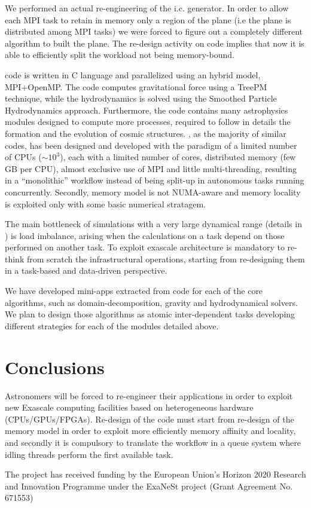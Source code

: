 \documentclass[11pt,twoside]{article}
\begin{document}
We performed an actual re-engineering of the i.c. generator. In order to allow each MPI task
to retain in memory only a region of the plane (i.e the plane is distributed among MPI tasks)
we were forced to figure out a completely different algorithm to built the plane.
The re-design activity on {} code implies that now it is able to
efficiently split the workload not being memory-bound.

{} code is written in C language and parallelized using an hybrid model, 
MPI+OpenMP. The code computes gravitational force using a TreePM technique, while the
hydrodynamics is solved using the Smoothed Particle Hydrodynamics approach.
Furthermore, the code contains many astrophysics modules designed to compute 
more processes, required to follow in details the formation and the evolution of cosmic structures.
{}, as the majority of similar codes, has been designed and developed 
with the paradigm of a limited number of CPUs ($\sim 10^{3}$), each with a limited number of cores, distributed memory (few GB per CPU), almost exclusive use of MPI and little multi-threading, resulting in a ``monolithic'' workflow instead of being split-up in autonomous tasks running concurrently.
Secondly, {} memory model is not NUMA-aware and memory locality is exploited only with some basic numerical stratagem.

The main bottleneck of simulations with a very large dynamical range (details in \citet{Murante_2015}) is load imbalance, arising when the calculations on a task depend on those performed on another task.
To exploit exascale architecture is mandatory to re-think from scratch the infrastructural operations, starting from re-designing them in a task-based and data-driven perspective.

We have developed mini-apps extracted from {} code for each of the core algorithms, such as domain-decomposition, gravity and hydrodynamical solvers. We plan to design those algorithms as atomic inter-dependent tasks developing different strategies for each of the modules detailed above.

\section{Conclusions}
Astronomers will be forced to re-engineer their applications in order to exploit new Exascale computing facilities based on heterogeneous hardware (CPUs/GPUs/FPGAs). Re-design of the code must start from re-design of the memory model in order to exploit more efficiently
memory affinity and locality, and secondly it is compulsory to translate the workflow in a queue system where idling threads perform the first available task.

\acknowledgements The project has received funding by the European Union's Horizon 2020 Research and Innovation Programme under the ExaNeSt project (Grant Agreement No. 671553)

\end{document}
